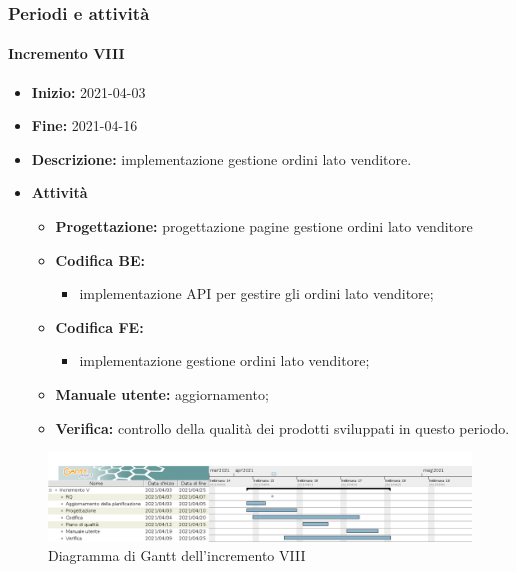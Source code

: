 \subsubsection{Periodi e attività}

\paragraph[Incremento VIII]{Incremento VIII}
\begin{itemize}
    \item [] \textbf{Inizio:} 2021-04-03
    \item [] \textbf{Fine:} 2021-04-16
    \item [] \textbf{Descrizione:} implementazione gestione ordini lato venditore.
    \item [] \textbf{Attività}
          \begin{itemize}
              \item \textbf{Progettazione:} progettazione pagine gestione ordini lato venditore
              \item \textbf{Codifica BE:}
                    \begin{itemize}
                        \item implementazione API per gestire gli ordini lato venditore;
                    \end{itemize}
              \item \textbf{Codifica FE:}
                    \begin{itemize}
                        \item implementazione gestione ordini lato venditore;
                    \end{itemize}
              \item \textbf{Manuale utente:} aggiornamento;
              \item \textbf{Verifica:} controllo della qualità dei prodotti sviluppati in questo periodo.
          \end{itemize}
\end{itemize}

\begin{figure}[H]
    \centering
    \includegraphics[width=1\linewidth]{res/images/pianificazione/incremento_8.png}
    \caption{Diagramma di Gantt dell'incremento VIII}
    \label{fig:_Gantt incremento VIII}
\end{figure}

